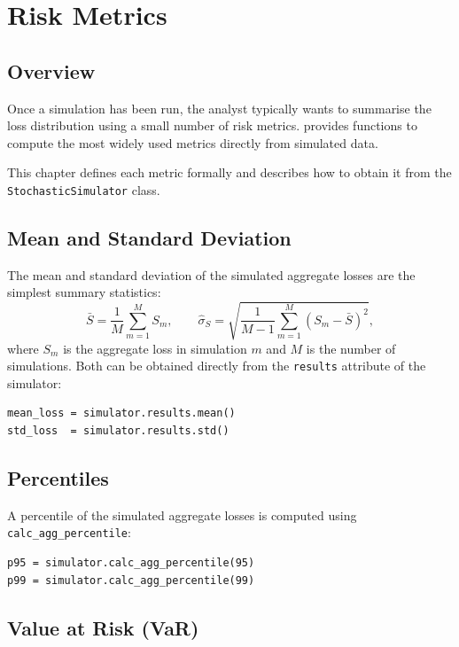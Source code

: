\chapter{Risk Metrics}
\label{chap:risk_metrics}

\section{Overview}

Once a simulation has been run, the analyst typically wants to summarise
the loss distribution using a small number of risk metrics. \actsim
provides functions to compute the most widely used metrics directly from
simulated data.

This chapter defines each metric formally and describes how to obtain it
from the \texttt{StochasticSimulator} class.

\section{Mean and Standard Deviation}

The mean and standard deviation of the simulated aggregate losses are the
simplest summary statistics:
\[
    \bar{S} = \frac{1}{M} \sum_{m=1}^{M} S_m,
    \qquad
    \hat{\sigma}_S = \sqrt{\frac{1}{M-1} \sum_{m=1}^{M} (S_m - \bar{S})^{2}},
\]
where $S_m$ is the aggregate loss in simulation $m$ and $M$ is the
number of simulations. Both can be obtained directly from the
\texttt{results} attribute of the simulator:

\begin{lstlisting}[style=pythonstyle]
mean_loss = simulator.results.mean()
std_loss  = simulator.results.std()
\end{lstlisting}

\section{Percentiles}

A percentile of the simulated aggregate losses is computed using
\texttt{calc\_agg\_percentile}:

\begin{lstlisting}[style=pythonstyle]
p95 = simulator.calc_agg_percentile(95)
p99 = simulator.calc_agg_percentile(99)
\end{lstlisting}

\section{Value at Risk (VaR)}

